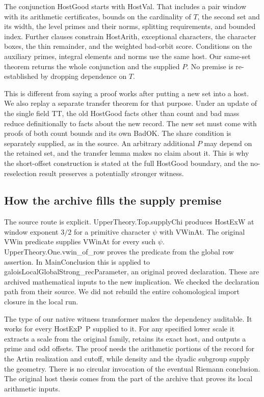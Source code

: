 \documentclass[12pt,letterpaper]{article}
\DeclareRobustCommand{\id}[1]{\mbox{\small\ttfamily #1}}
\begin{document}
The conjunction \id{HostGood} starts with \id{HostVal}. That includes a pair window with its arithmetic certificates, bounds on the cardinality of \(T\), the second set and its width, the level primes and their norms, splitting requirements, and bounded index. Further clauses constrain \id{HostArith}, exceptional characters, the character boxes, the thin remainder, and the weighted bad-orbit score. Conditions on the auxiliary primes, integral elements and norms use the same host. Our same-set theorem returns the whole conjunction and the supplied \(P\). No premise is re-established by dropping dependence on \(T\).

This is different from saying a proof works after putting a new set into a host. We also replay a separate transfer theorem for that purpose. Under an update of the single field \id{TT}, the old \id{HostGood} facts other than count and bad mass reduce definitionally to facts about the new record. The new set must come with proofs of both count bounds and its own \id{BadOK}. The share condition is separately supplied, as in the source. An arbitrary additional \(P\) may depend on the retained set, and the transfer lemma makes no claim about it. This is why the short-offset construction is stated at the full \id{HostGood} boundary, and the no-reselection result preserves a potentially stronger witness.

\subsection{How the archive fills the supply premise}

The source route is explicit. \id{UpperTheory.Top.supplyChi} produces \id{HostExW} at window exponent \(3/2\) for a primitive character \(\psi\) with \id{VWinAt}. The original \id{VWin} predicate supplies \id{VWinAt} for every such \(\psi\). \id{UpperTheory.One.vwin\_of\_row} proves the predicate from the global row assertion. In \id{MainConclusion} this is applied to \id{galoisLocalGlobalStrong\_recParameter}, an original proved declaration. These are archived mathematical inputs to the new implication. We checked the declaration path from their source. We did not rebuild the entire cohomological import closure in the local run.

The type of our native witness transformer makes the dependency auditable. It works for every \id{HostExP P} supplied to it. For any specified lower scale it extracts a scale from the original family, retains its exact host, and outputs a prime and odd offsets. The proof needs the arithmetic portions of the record for the Artin realization and cutoff, while density and the dyadic subgroup supply the geometry. There is no circular invocation of the eventual Riemann conclusion. The original host thesis comes from the part of the archive that proves its local arithmetic inputs.
\end{document}
